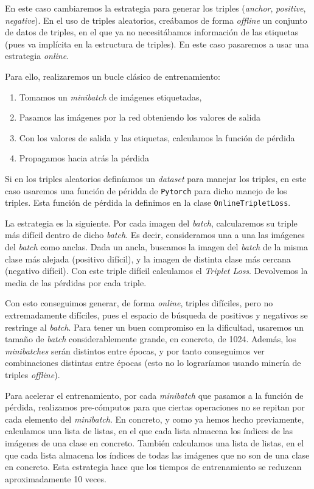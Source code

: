 \documentclass[11pt]{article}
\begin{document}
En este caso cambiaremos la estrategia para generar los triples (\emph{anchor}, \emph{positive}, \emph{negative}). En el uso de triples aleatorios, creábamos de forma \emph{offline} un conjunto de datos de triples, en el que ya no necesitábamos información de las etiquetas (pues va implícita en la estructura de triples). En este caso pasaremos a usar una estrategia \emph{online}.

Para ello, realizaremos un bucle clásico de entrenamiento:

\begin{enumerate}
  \item Tomamos un \emph{minibatch} de imágenes etiquetadas,
  \item Pasamos las imágenes por la red obteniendo los valores de salida
  \item Con los valores de salida y las etiquetas, calculamos la función de pérdida
  \item Propagamos hacia atrás la pérdida
\end{enumerate}

Si en los triples aleatorios definíamos un \emph{dataset} para manejar los triples, en este caso usaremos una función de péridda de \lstinline{Pytorch} para dicho manejo de los triples. Esta función de pérdida la definimos en la clase \lstinline{OnlineTripletLoss}.

La estrategia es la siguiente. Por cada imagen del \emph{batch}, calcularemos su triple más difícil dentro de dicho \emph{batch}. Es decir, consideramos una a una las imágenes del \emph{batch} como anclas. Dada un ancla, buscamos la imagen del \emph{batch} de la misma clase más alejada (positivo difícil), y la imagen de distinta clase más cercana (negativo difícil). Con este triple difícil calculamos el \emph{Triplet Loss}. Devolvemos la media de las pérdidas por cada triple.

Con esto conseguimos generar, de forma \emph{online}, triples difíciles, pero no extremadamente difíciles, pues el espacio de búsqueda de positivos y negativos se restringe al \emph{batch}. Para tener un buen compromiso en la dificultad, usaremos un tamaño de \emph{batch} considerablemente grande, en concreto, de 1024. Además, los \emph{minibatches} serán distintos entre épocas, y por tanto conseguimos ver combinaciones distintas entre épocas (esto no lo lograríamos usando minería de triples \emph{offline}).

Para acelerar el entrenamiento, por cada \emph{minibatch} que pasamos a la función de pérdida, realizamos pre-cómputos para que ciertas operaciones no se repitan por cada elemento del \emph{minibatch}. En concreto, y como ya hemos hecho previamente, calculamos una lista de listas, en el que cada lista almacena los índices de las imágenes de una clase en concreto. También calculamos una lista de listas, en el que cada lista almacena los índices de todas las imágenes que no son de una clase en concreto. Esta estrategia hace que los tiempos de entrenamiento se reduzcan aproximadamente 10 veces.
\end{document}
